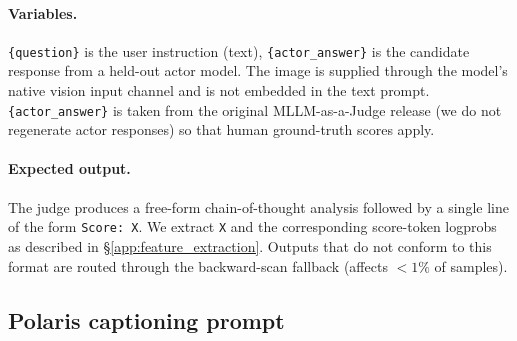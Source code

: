 \documentclass{article}
\begin{document}
\paragraph{Variables.} \texttt{\{question\}} is the user instruction (text), \texttt{\{actor\_answer\}} is the candidate response from a held-out actor model. The image is supplied through the model's native vision input channel and is not embedded in the text prompt. \texttt{\{actor\_answer\}} is taken from the original MLLM-as-a-Judge release (we do not regenerate actor responses) so that human ground-truth scores apply.

\paragraph{Expected output.} The judge produces a free-form chain-of-thought analysis followed by a single line of the form \texttt{Score: X}. We extract \texttt{X} and the corresponding score-token logprobs as described in \S\ref{app:feature_extraction}. Outputs that do not conform to this format are routed through the backward-scan fallback (affects $< 1\%$ of samples).

\subsection{Polaris captioning prompt}
\label{app:prompt_polaris}
\end{document}
